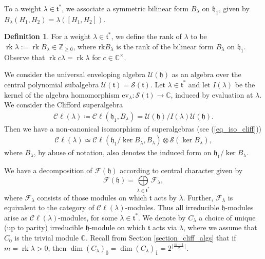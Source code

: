 \documentclass[12pt, a4paper, reqno]{amsart}
\def\C{\mathbb{C}}
\def\UU{\mathcal{U}}
\def\FF{\mathcal{F}}
\def\CC{\mathcal{C}}
\def\h{\mathfrak{h}}
\def\ol{\overline}
\def\rk{\operatorname{rk}}
\theoremstyle{definition}
\newtheorem{definition}{Definition}
\theoremstyle{definition}
\theoremstyle{definition}
\numberwithin{theorem}{section}
\numberwithin{lemma}{section}
\numberwithin{remark}{section}
\numberwithin{definition}{section}
\numberwithin{corollary}{section}
\numberwithin{proposition}{section}
\numberwithin{example}{section}
\begin{document}
	To a weight \(\lambda \in \mathfrak{t}^*\), we associate a symmetric bilinear form \(B_{\lambda}\) on \(\mathfrak{h}_{\ol{1}}\), given by \(B_{\lambda}(H_1,H_2) = \lambda([H_1,H_2])\).
	\begin{definition}\label{definition-rank}
		For a weight \(\lambda \in \mathfrak{t}^*\), we define the rank of $\lambda$ to be \(\operatorname{rk}\lambda:=\rk B_{\lambda} \in \mathbb{Z}_{\geq 0 }\), where $\mathrm{rk}B_{\lambda}$ is the rank of the bilinear form $B_{\lambda}$ on $\h_{\ol{1}}$.  Observe that $\rk c\lambda=\rk\lambda$ for $c\in\C^\times$.
	\end{definition}
	We consider the universal enveloping algebra \(\mathcal{U}(\mathfrak{h})\) as an algebra over the central polynomial subalgebra \(\UU(\mathfrak{t})=\mathcal{S}(\mathfrak{t})\). Let \(\lambda \in \mathfrak{t}^*\) and let \(I(\lambda)\) be the kernel of the algebra homomorphism \(\mathrm{ev}_{\lambda} : \mathcal{S}(\mathfrak{t})\rightarrow \mathbb{C}\), induced by evaluation at \(\lambda\). We consider the Clifford superalgebra
	\begin{align*}
		\mathcal{C}\ell(\lambda) \coloneq \mathcal{C}\ell(\mathfrak{h}_{\ol{1}},B_{\lambda}) = \mathcal{U}(\mathfrak{h})/I(\lambda)\mathcal{U}(\mathfrak{h}).
	\end{align*}
	Then we have a non-canonical isomorphism of superalgebras (see (\ref{eq_iso_cliff}))
	\begin{align*}
		\mathcal{C}\ell(\lambda) \simeq \mathcal{C}\ell(\mathfrak{h}_{\ol{1}}/\ker B_\lambda,B_{\lambda}) \otimes \mathcal{S} (\ker B_\lambda),
	\end{align*}
	where \(B_{\lambda}\), by abuse of notation, also denotes the induced form on \(\mathfrak{h}_{\ol{1}}/\ker B_\lambda\). \par
	We have a decomposition of $\FF(\h)$ according to central character given by
	\[
	\FF(\h)=\bigoplus\limits_{\lambda\in\mathfrak{t}^*}\FF_{\lambda},
	\]
	where $\FF_{\lambda}$ consists of those modules on which $\mathfrak{t}$ acts by $\lambda$.  Further, $\FF_{\lambda}$ is equivalent to the category of $\CC\ell(\lambda)$-modules.  Thus all irreducible \(\mathfrak{h}\)-modules arise as  \(\mathcal{C}\ell(\lambda)\)-modules, for some \(\lambda \in \mathfrak{t}^*\). We denote by \(C_\lambda\) a choice of unique (up to parity) irreducible \(\mathfrak{h}\)-module on which \(\mathfrak{t}\) acts via \(\lambda\), where we assume that $C_0$ is the trivial module $\C$.   Recall from Section \ref{section_cliff_algs} that if $m=\rk\lambda>0$, then $\dim (C_{\lambda})_{\ol{0}}= \dim(C_{\lambda})_{\ol{1}}=2^{\lfloor \frac{m-1}{2} \rfloor}$.
	
\end{document}
